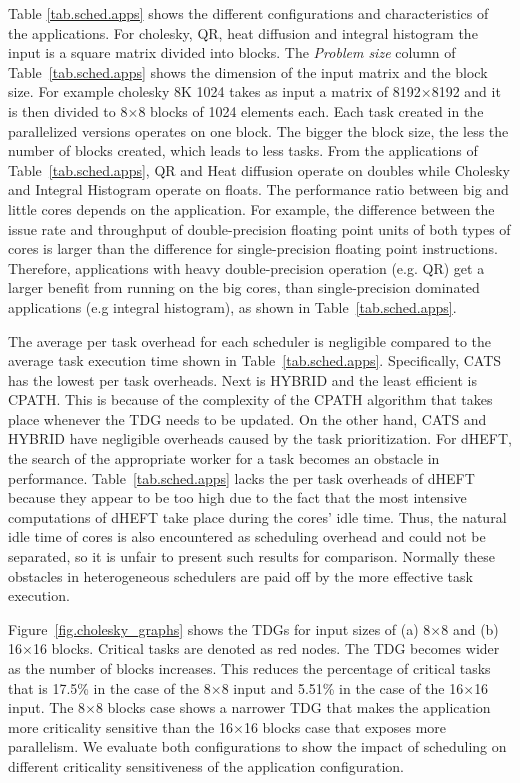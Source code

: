 Table \ref{tab.sched.apps} shows the different configurations and characteristics of the applications.
For cholesky, QR, heat diffusion and integral histogram the input is a square matrix divided into blocks.
The \textit{Problem size} column of Table~\ref{tab.sched.apps} shows the dimension of the input matrix and the block size.
For example cholesky 8K 1024 takes as input a matrix of 8192$\times$8192 and it is then divided to 8$\times$8 blocks of 1024 elements each.
Each task created in the parallelized versions operates on one block.
The bigger the block size, the less the number of blocks created, which leads to less tasks. 
From the applications of Table~\ref{tab.sched.apps}, QR and Heat diffusion operate on doubles while Cholesky and Integral Histogram operate on floats.
The performance ratio between big and little cores depends on the application. 
For example, the difference between the issue rate and throughput of double-precision floating point units of both types of cores is larger than the difference for single-precision floating point instructions. Therefore, applications with heavy double-precision operation (e.g. QR) get a larger benefit from running on the big cores, than single-precision dominated applications (e.g integral histogram), as shown in Table~\ref{tab.sched.apps}.

The average per task overhead for each scheduler is negligible compared to the average task execution time shown in Table~\ref{tab.sched.apps}. Specifically, CATS has the lowest per task overheads. Next is HYBRID and the least efficient is CPATH. This is because of the complexity of the CPATH algorithm that takes place whenever the TDG needs to be updated.
On the other hand, CATS and HYBRID have negligible overheads caused by the task prioritization.
For dHEFT, the search of the appropriate worker for a task becomes an obstacle in performance. 
Table~\ref{tab.sched.apps} lacks the per task overheads of dHEFT because they appear to be too high due to the fact that the most intensive computations of dHEFT take place during the cores' idle time.
Thus, the natural idle time of cores is also encountered as scheduling overhead and could not be separated, so it is unfair to present such results for comparison. 
Normally these obstacles in heterogeneous schedulers are paid off by the more effective task execution. 

Figure~\ref{fig.cholesky_graphs} shows the TDGs for input sizes of (a) 8$\times$8 and (b) 16$\times$16 blocks.
Critical tasks are denoted as red nodes. 
The TDG becomes wider as the number of blocks increases. 
This reduces the percentage of critical tasks that is 17.5\% in the case of the 8$\times$8 input and 5.51\% in the case of the 16$\times$16 input. 
The 8$\times$8 blocks case shows a narrower TDG that makes the application more criticality sensitive than the 16$\times$16 blocks case that exposes more parallelism. 
We evaluate both configurations to show the impact of scheduling on different criticality sensitiveness of the application configuration.

